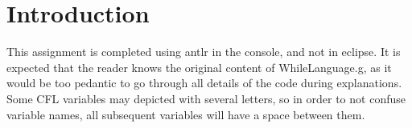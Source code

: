 \section*{Introduction}
 
This assignment is completed using antlr in the console, and not in eclipse. It is expected that the reader knows the original content of WhileLanguage.g, as it would be too pedantic to go through all details of the code during explanations. Some CFL variables may depicted with several letters, so in order to not confuse variable names, all subsequent variables will have a space between them.